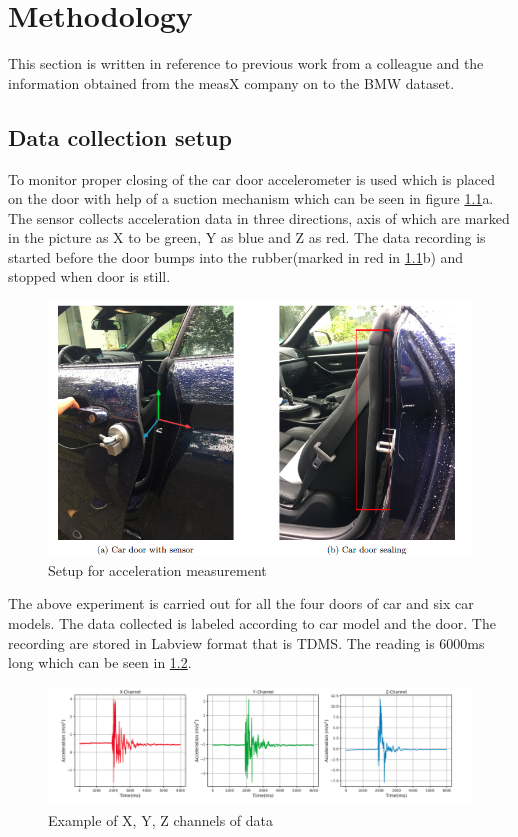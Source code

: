 

    \chapter{Methodology}
   This section is written in reference to previous work from a colleague and the information obtained from the measX company on to the BMW dataset.

    \section{Data collection setup}
    To monitor proper closing of the car door accelerometer is used which is placed on the door with help of a suction mechanism which can be seen in figure \ref{n1}a. The sensor collects acceleration data in three directions, axis of which are marked in the picture as X to be green, Y as blue and Z as red. The data recording is started before the door bumps into the rubber(marked in red in \ref{n1}b) and stopped when door is still. 
        \begin{figure}[h]
        	\centering
        	\includegraphics[width=0.9\linewidth]{images/cardoor.png}
        	\caption{Setup for acceleration measurement}
        	\label{n1}
        \end{figure}
        
   The above experiment is carried out for all the four doors of car and six car models. The data collected is labeled according to car model and the door. The recording are stored in Labview format that is TDMS. The reading is 6000ms long which can be seen in \ref{n2}. 
   
   \begin{figure}[h]
   	\centering
   	\includegraphics[width=0.9\linewidth]{images/signal.png}
   	\caption{Example of X, Y, Z channels of data}
   	\label{n2}
   \end{figure}
